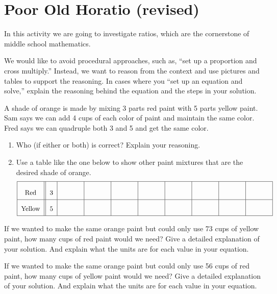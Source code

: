 \newpage
\section{Poor Old Horatio (revised)}\label{A:ratios}
In this activity we are going to investigate ratios, which are the cornerstone of middle school mathematics.  

We would like to avoid procedural approaches, such as, ``set up a proportion and cross multiply.''  Instead, we want to reason from the context and use pictures and tables to support the reasoning.  In cases where you ``set up an equation and solve,'' explain the reasoning behind the equation and the steps in your solution.  


\begin{prob}
A shade of orange is made by mixing 3 parts red paint with 5 parts
yellow paint.  Sam says we can add 4 cups of each color of paint and
maintain the same color.  Fred says we can quadruple both 3 and 5 and
get the same color.  
\begin{enumerate}
\item Who (if either or both) is correct?  Explain your reasoning.
\vspace{0.25in}

\item Use a table like the one below to show other paint mixtures that are the desired shade of orange.  
\[{\renewcommand{\arraystretch}{2}
\begin{tabular}{|c||c|c|c|c|c|c|c|c|c|}\hline
Red  &  3 &\rule[7mm]{10mm}{0mm} & \rule[7mm]{10mm}{0mm} & \rule[7mm]{10mm}{0mm}  & \rule[7mm]{10mm}{0mm}
 & \rule[7mm]{10mm}{0mm} & \rule[7mm]{10mm}{0mm} & \rule[7mm]{10mm}{0mm} & \rule[7mm]{10mm}{0mm}   \\ \hline
Yellow & 5 &  &  &  & & & & & \\ \hline
\end{tabular}}
\]
\end{enumerate}
\end{prob}


\begin{prob}
If we wanted to make the same orange paint but could only use 73 cups of yellow paint, how
many cups of red paint would we need?  Give a detailed explanation of your solution. And 
explain what the units are for each value in your equation.
\end{prob}

\vspace{0.25in}

\begin{prob}
If we wanted to make the same orange paint but could only use 56 cups of red paint, how
many cups of yellow paint would we need?  Give a detailed explanation of your solution. And 
explain what the units are for each value in your equation.
\end{prob}

